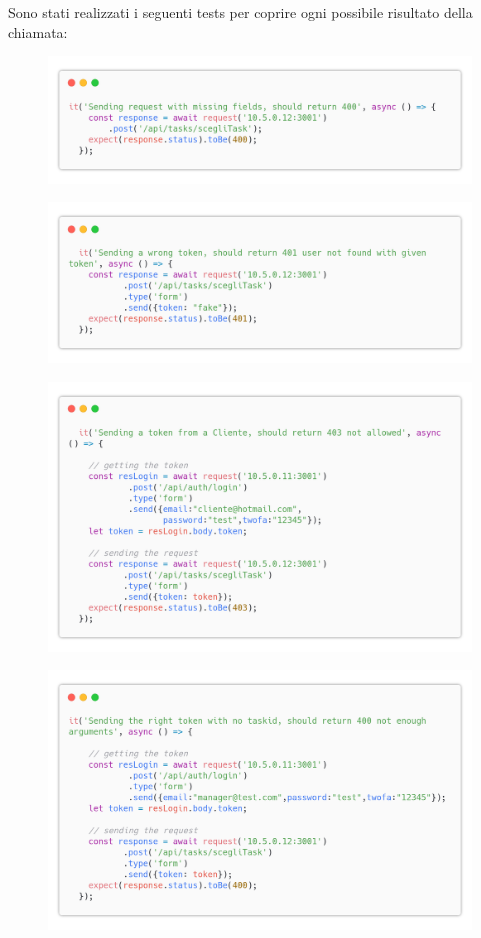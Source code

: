 \documentclass{report}
\begin{document}
Sono stati realizzati i seguenti tests per coprire ogni possibile risultato della chiamata:
\begin{figure}[H]
	\centering\includegraphics[width=1\textwidth]{images/code_scegli_task_test1.png}
\end{figure}
\begin{figure}[H]
	\centering\includegraphics[width=1\textwidth]{images/code_scegli_task_test2.png}
\end{figure}
\begin{figure}[H]
	\centering\includegraphics[width=1\textwidth]{images/code_scegli_task_test3.png}
\end{figure}
\begin{figure}[H]
	\centering\includegraphics[width=1\textwidth]{images/code_scegli_task_test4.png}
\end{figure}
\end{document}
